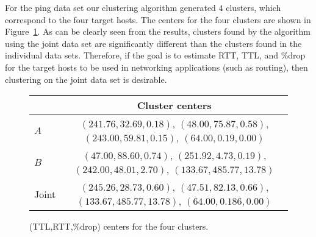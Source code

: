 For the ping data set our clustering algorithm generated $4$ clusters,
which correspond to the four target hosts. The centers for the four
clusters are shown in Figure~\ref{fig:kmeans-clusters}. As can be clearly
seen from the results, clusters found by the algorithm using the joint
data set are significantly different than the clusters found in the
individual data sets. Therefore, if the goal is to estimate RTT, TTL,
and \%drop for the target hosts to be used in networking applications
(such as routing), then clustering on the joint data set is desirable.

\begin{figure}
\begin{center}
\begin{tabular}{|l|c|} \hline
  & Cluster centers \\ \hline
$A$ &  {\small $(241.76,32.69,0.18)$, $(48.00,75.87,0.58)$, $(243.00,59.81,0.15)$, $(64.00,0.19,0.00)$}\\ \hline
$B$ &  {\small $(47.00,88.60,0.74)$, $(251.92,4.73,0.19)$, $(242.00,48.01,2.70)$, $(133.67,485.77,13.78)$}\\ \hline
Joint & {\small $(245.26,28.73,0.60)$, $(47.51,82.13,0.66)$, $(133.67,485.77,13.78)$, $(64.00,0.186,0.00)$}  \\ \hline
\end{tabular}
\end{center}
\caption{(TTL,RTT,\%drop) centers for the four clusters.}
\label{fig:kmeans-clusters}
\end{figure}
